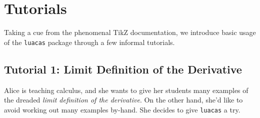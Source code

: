 \documentclass{article}
\begin{document}
\section{Tutorials}

Taking a cue from the phenomenal TikZ documentation, we introduce basic usage of the \texttt{luacas} package through a few informal tutorials.  

\subsection{Tutorial 1: Limit Definition of the Derivative}

Alice is teaching calculus, and she wants to give her students many examples of the dreaded \emph{limit definition of the derivative}. On the other hand, she'd like to avoid working out many examples by-hand. She decides to give \texttt{luacas} a try.
\end{document}
